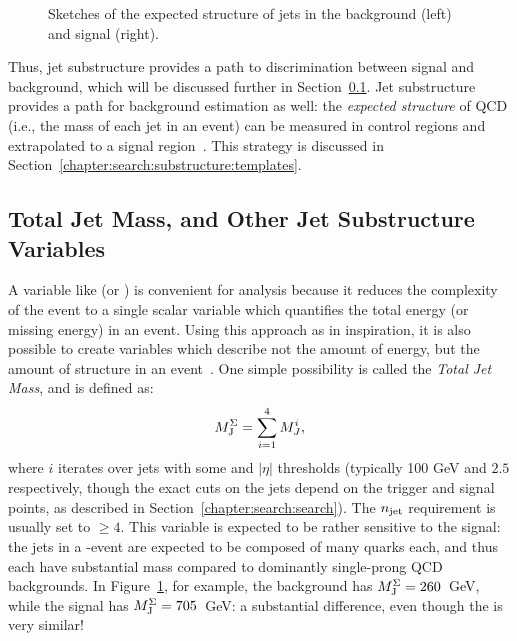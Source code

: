 
\begin{figure}
\centering
{}
\caption{Sketches of the expected structure of \largeR jets in the background (left) and signal (right).}
\label{fig:search:motivation:event-displays}
\end{figure}



Thus, jet substructure provides a path to discrimination between signal and background, which will be discussed further in Section~\ref{chapter:search:substructure:mj}. Jet substructure provides a path for background estimation as well: the \textit{expected structure} of QCD (i.e., the mass of each jet in an event) can be measured in control regions and extrapolated to a signal region~\cite{MassTemplates}. This strategy is discussed in Section~\ref{chapter:search:substructure:templates}. 

\subsection{Total Jet Mass, and Other Jet Substructure Variables}
	\label{chapter:search:substructure:mj}

A variable like \Ht (or \met) is convenient for analysis because it reduces the complexity of the event to a single scalar variable which quantifies the total energy (or missing energy) in an event. Using this approach as in inspiration, it is also possible to create variables which describe not the amount of energy, but the amount of structure in an event~\cite{Hook:2012fd}. One simple possibility is called the \textit{Total Jet Mass}, and is defined as:
%
\begin{equation}
M_{\textrm{J}}^{\Sigma} = \sum_{i=1}^4 M_J^i,
\end{equation}
%
where $i$ iterates over jets with some \pt and $|\eta|$ thresholds (typically 100 GeV and $2.5$ respectively, though the exact \pt cuts on the jets depend on the trigger and signal points, as described in Section~\ref{chapter:search:search}). The $n_{\rm jet}$ requirement is usually set to $\geq 4$.  This \MJ variable is expected to be rather sensitive to the signal: the \largeR jets in a \gl-\gl event are expected to be composed of many quarks each, and thus each have substantial mass compared to dominantly single-prong QCD backgrounds. In Figure~\ref{fig:search:motivation:event-displays}, for example, the background has $M_{\textrm{J}}^{\Sigma} = 260$~GeV, while the signal has $M_{\textrm{J}}^{\Sigma} = 705$~GeV: a substantial difference, even though the \HT is very similar!

